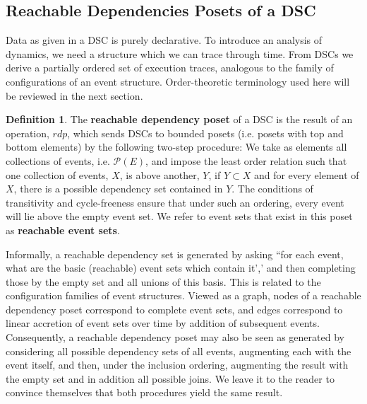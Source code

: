 \documentclass[hoptionsi,review,screen,format=sigconf]{acmart}
\theoremstyle{definition}
\newtheorem{definition}{Definition}[section]
\newcommand{\Pc}{\mathcal{P}}
\begin{document}
\subsection{Reachable Dependencies Posets of a DSC}

Data as given in a DSC is purely declarative. To introduce an analysis of dynamics, we need a structure which we can trace through time. From DSCs we derive a partially ordered set of execution traces, analogous to the family of configurations of an event structure. Order-theoretic terminology used here will be reviewed in the next section.

\begin{definition} The \textbf{reachable dependency poset} of a DSC is the result of an operation, \(rdp\), which sends DSCs to bounded posets (i.e. posets with top and bottom elements) by the following two-step procedure:  We take as elements all collections of events, i.e. \(\Pc(E)\), and impose the least order relation such that one collection of events, \(X\), is above another, \(Y\), if \(Y \subset X\) and for every element of \(X\), there is a possible dependency set contained in \(Y\).  The conditions of transitivity and cycle-freeness ensure that under such an ordering, every event will lie above the empty event set. We refer to event sets that exist in this poset as \textbf{reachable event sets}.
\end{definition}

Informally, a reachable dependency set is generated by asking ``for each event, what are the basic (reachable) event sets which contain it',' and then completing those by the empty set and all unions of this basis. This is related to the configuration families of event structures. Viewed as a graph, nodes of a reachable dependency poset correspond to complete event sets, and edges correspond to linear accretion of event sets over time by addition of subsequent events. Consequently, a reachable dependency poset may also be seen as generated by considering all possible dependency sets of all events, augmenting each with the event itself, and then, under the inclusion ordering, augmenting the result with the empty set and in addition all possible joins. We leave it to the reader to convince themselves that both procedures yield the same result.
\end{document}
